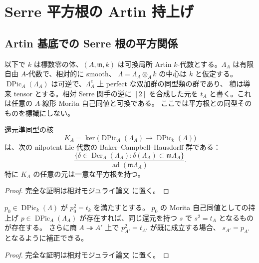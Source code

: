 \section{Serre 平方根の Artin 持上げ}
\label{sec:artin-serre-roots}
\subsection{Artin 基底での Serre 根の平方関係}

以下で $k$ は標数零の体、$(A,\mathfrak m,k)$ は可換局所 Artin
$k$-代数とする。$\Lambda_A$ は有限自由 $A$-代数で、相対的に smooth、
$\Lambda=\Lambda_A\otimes_Ak$ の中心は $k$ と仮定する。
$\operatorname{DPic}_A(\Lambda_A)$ は可逆で、$\Lambda_A^e$ 上 perfect な双加群の同型類の群であり、
積は導来 tensor とする。相対 Serre 関手の逆に $[2]$ を合成した元を
$t_A$ と書く。これは任意の $A$-線形 Morita 自己同値と可換である。
ここでは平方根との同型そのものを標識にしない。

\begin{lemma}
\label{lem:artin-infinitesimal-dpic}
還元準同型の核
\[
 K_A=\ker\bigl(\operatorname{DPic}_A(\Lambda_A)
           \longrightarrow\operatorname{DPic}_k(\Lambda)\bigr)
\]
は、次の nilpotent Lie 代数の Baker--Campbell--Hausdorff 群である：
\[
 \frac{\{\delta\in\operatorname{Der}_A(\Lambda_A):
                    \delta(\Lambda_A)\subset\mathfrak m\Lambda_A\}}
      {\operatorname{ad}(\mathfrak m\Lambda_A)}.
\]
特に $K_A$ の任意の元は一意な平方根を持つ。
\end{lemma}
\begin{proof}
完全な証明は相対モジュライ論文 \cite[\texttt{artin_roots}]{QuadricModuli2026} に置く。
\end{proof}

\begin{proposition}[平方関係の補正]
\label{prop:artin-serre-square-correction}
$p_0\in\operatorname{DPic}_k(\Lambda)$ が $p_0^2=t_k$ を満たすとする。
$p_0$ の Morita 自己同値としての持上げ $p\in\operatorname{DPic}_A(\Lambda_A)$
が存在すれば、同じ還元を持つ $s$ で $s^2=t_A$ となるものが存在する。
さらに商 $A\twoheadrightarrow A'$ 上で $p_{A'}^2=t_{A'}$ が既に成立する場合、
$s_{A'}=p_{A'}$ となるように補正できる。
\end{proposition}
\begin{proof}
完全な証明は相対モジュライ論文 \cite[\texttt{artin_roots}]{QuadricModuli2026} に置く。
\end{proof}

